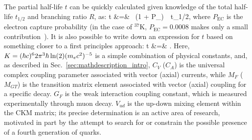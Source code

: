 The partial half-life $t$ can be quickly calculated given knowledge of the total half-life $t_{1/2}$ and branching ratio $R$, as:
\bea
t &=&   \, (1 + P_{}) \,\, t_{1/2}, 
\eea
where $P_{\mathrm{EC}}$ is the electron capture probability (in the case of $^{37}$K, $P_{\mathrm{EC}}=0.0008$ makes only a small contribution~\cite{SeverijnsTandecki2008}).  
It is also possible to write down an expression for $t$ based on something closer to a first principles approach:  
\bea
t &=& .
\label{eq:partialhalflife_theory}
\eea
Here, $K = (\hbar c)^6 2\pi^3 \hbar \ln(2) (m_e c^2)^{-5}$ is a simple combination of physical constants, and, as described in Sec.~\ref{sec:mathdescription_intro}, $C_V$ ($C_A$) is the universal complex coupling parameter associated with vector (axial) currents, while $M_F$ ($M_{GT}$) is the transition matrix element associated with vector (axial) coupling for a specific decay.
$G_F$ is the weak interaction coupling constant, which is measured experimentally through muon decay.  $V_{ud}$ is the up-down mixing element within the \ac{CKM} matrix; its precise determination is an active area of research, motivated in part by the attempt to search for or constrain the possible presence of a fourth generation of quarks.  

